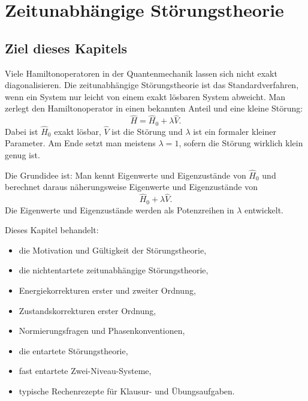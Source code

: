 \providecommand{\ket}[1]{\left|#1\right\rangle}
\providecommand{\bra}[1]{\left\langle#1\right|}
\providecommand{\braket}[2]{\left\langle#1\middle|#2\right\rangle}
\providecommand{\mel}[3]{\left\langle#1\middle|#2\middle|#3\right\rangle}
\providecommand{\ii}{\mathrm{i}}
\providecommand{\e}{\mathrm{e}}
\providecommand{\idop}{\mathbf{1}}
\providecommand{\opH}{\hat H}
\providecommand{\opV}{\hat V}
\providecommand{\opW}{\hat W}

\chapter{Zeitunabhängige Störungstheorie}

\section{Ziel dieses Kapitels}

Viele Hamiltonoperatoren in der Quantenmechanik lassen sich nicht exakt diagonalisieren. Die zeitunabhängige Störungstheorie ist das Standardverfahren, wenn ein System nur leicht von einem exakt lösbaren System abweicht. Man zerlegt den Hamiltonoperator in einen bekannten Anteil und eine kleine Störung:
\[
    \opH = \opH_0 + \lambda \opV.
\]
Dabei ist \(\opH_0\) exakt lösbar, \(\opV\) ist die Störung und \(\lambda\) ist ein formaler kleiner Parameter. Am Ende setzt man meistens \(\lambda=1\), sofern die Störung wirklich klein genug ist.

\begin{conceptbox}
Die Grundidee ist: Man kennt Eigenwerte und Eigenzustände von \(\opH_0\) und berechnet daraus näherungsweise Eigenwerte und Eigenzustände von
\[
    \opH_0+\lambda\opV.
\]
Die Eigenwerte und Eigenzustände werden als Potenzreihen in \(\lambda\) entwickelt.
\end{conceptbox}

Dieses Kapitel behandelt:
\begin{itemize}
    \item die Motivation und Gültigkeit der Störungstheorie,
    \item die nichtentartete zeitunabhängige Störungstheorie,
    \item Energiekorrekturen erster und zweiter Ordnung,
    \item Zustandskorrekturen erster Ordnung,
    \item Normierungsfragen und Phasenkonventionen,
    \item die entartete Störungstheorie,
    \item fast entartete Zwei-Niveau-Systeme,
    \item typische Rechenrezepte für Klausur- und Übungsaufgaben.
\end{itemize}

